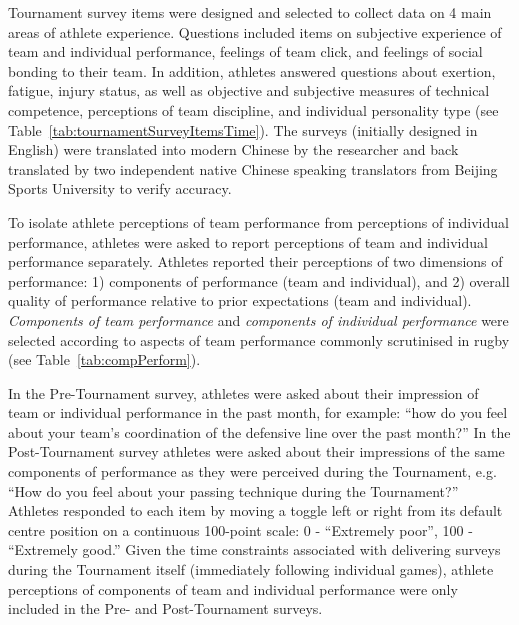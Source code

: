 \begin{CJK}{UTF8}{gbsn}
Tournament survey items were designed and selected to collect data on 4 main areas of athlete experience.  Questions included items on subjective experience of team and individual performance, feelings of team click, and feelings of social bonding to their team.  In addition, athletes answered questions about exertion, fatigue, injury status, as well as objective and subjective measures of technical competence, perceptions of team discipline, and individual personality type (see Table~\ref{tab:tournamentSurveyItemsTime}). The surveys (initially designed in English) were translated into modern Chinese by the researcher and back translated by two independent native Chinese speaking translators from Beijing Sports University to verify accuracy.






To isolate athlete perceptions of team performance from perceptions of individual performance, athletes were asked to report perceptions of team and individual performance separately.  Athletes reported their perceptions of two dimensions of performance: 1) components of performance (team and individual), and 2) overall quality of performance relative to prior expectations (team and individual).  \textit{Components of team performance} and \textit{components of individual performance} were selected according to aspects of team performance commonly scrutinised in rugby (see Table~\ref{tab:compPerform}).




In the Pre-Tournament survey, athletes were asked about their impression of team or individual performance in the past month, for example: ``how do you feel about your team's coordination of the defensive line over the past month?''  In the Post-Tournament survey athletes were asked about their impressions of the same components of performance as they were perceived during the Tournament, e.g. ``How do you feel about your passing technique during the Tournament?'' Athletes responded to each item by moving a toggle left or right from its default centre position on a continuous 100-point scale: 0 - ``Extremely poor'', 100 - ``Extremely good.''  Given the time constraints associated with delivering surveys during the Tournament itself (immediately following individual games), athlete perceptions of components of team and individual performance were only included in the Pre- and Post-Tournament surveys.


\end{CJK}

